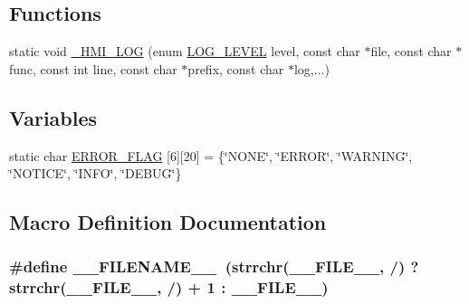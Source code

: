 \subsection*{Functions}
\begin{DoxyCompactItemize}
\item 
static void \hyperlink{include_2hmi-debug_8h_a0846b9d51e2e0612c4825a9a581aa40a}{\+\_\+\+H\+M\+I\+\_\+\+L\+OG} (enum \hyperlink{include_2hmi-debug_8h_aa5a9053636a30269210c54e734e0d583}{L\+O\+G\+\_\+\+L\+E\+V\+EL} level, const char $\ast$file, const char $\ast$func, const int line, const char $\ast$prefix, const char $\ast$log,...)
\end{DoxyCompactItemize}
\subsection*{Variables}
\begin{DoxyCompactItemize}
\item 
static char \hyperlink{include_2hmi-debug_8h_a13d4c7647aad2e84766f8b48a6caab09}{E\+R\+R\+O\+R\+\_\+\+F\+L\+AG} \mbox{[}6\mbox{]}\mbox{[}20\mbox{]} = \{\char`\"{}N\+O\+NE\char`\"{}, \char`\"{}E\+R\+R\+OR\char`\"{}, \char`\"{}W\+A\+R\+N\+I\+NG\char`\"{}, \char`\"{}N\+O\+T\+I\+CE\char`\"{}, \char`\"{}I\+N\+FO\char`\"{}, \char`\"{}D\+E\+B\+UG\char`\"{}\}
\end{DoxyCompactItemize}


\subsection{Macro Definition Documentation}
\subsubsection[{\texorpdfstring{\+\_\+\+\_\+\+F\+I\+L\+E\+N\+A\+M\+E\+\_\+\+\_\+}{__FILENAME__}}]{\setlength{\rightskip}{0pt plus 5cm}\#define \+\_\+\+\_\+\+F\+I\+L\+E\+N\+A\+M\+E\+\_\+\+\_\+~(strrchr(\+\_\+\+\_\+\+F\+I\+L\+E\+\_\+\+\_\+, \textquotesingle{}/\textquotesingle{}) ? strrchr(\+\_\+\+\_\+\+F\+I\+L\+E\+\_\+\+\_\+, \textquotesingle{}/\textquotesingle{}) + 1 \+: \+\_\+\+\_\+\+F\+I\+L\+E\+\_\+\+\_\+)}\hypertarget{include_2hmi-debug_8h_a5fccb4fc71e44089a1b1a77fc76c0b68}{}\label{include_2hmi-debug_8h_a5fccb4fc71e44089a1b1a77fc76c0b68}


